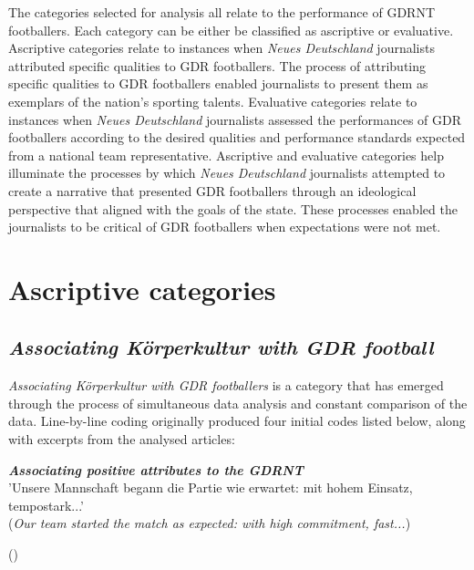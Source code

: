 The categories selected for analysis all relate to the performance of GDRNT footballers. Each category can be either be classified as ascriptive or evaluative. Ascriptive categories relate to instances when \textit{Neues Deutschland} journalists attributed specific qualities to GDR footballers. The process of attributing specific qualities to GDR footballers enabled journalists to present them as exemplars of the nation’s sporting talents.  Evaluative categories relate to instances when \textit{Neues Deutschland} journalists assessed the performances of GDR footballers according to the desired qualities and performance standards expected from a national team representative. Ascriptive and evaluative categories help illuminate the processes by which \textit{Neues Deutschland} journalists attempted to create a narrative that presented GDR footballers through an ideological perspective that aligned with the goals of the state. These processes enabled the journalists to be critical of GDR footballers when expectations were not met.

\section*{Ascriptive categories}

\subsection*{\textit{Associating Körperkultur with GDR football}}

\textit{Associating Körperkultur with GDR footballers} is a category that has emerged through the process of simultaneous data analysis and constant comparison of the data. Line-by-line coding originally produced four initial codes listed below, along with excerpts from the analysed articles:

\begin{displayquote}
\begin{small}
\textbf{\textit{Associating positive attributes to the GDRNT}}\\
'Unsere Mannschaft begann die Partie wie erwartet: mit hohem Einsatz, tempostark...'\\
(\textit{Our team started the match as expected: with high commitment, fast...})\
\begin{flushright}\footnotesize (\cite{nd19740619})\end{flushright}
\end{small}
\end{displayquote}

